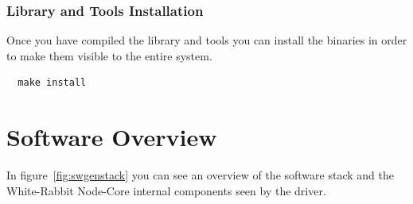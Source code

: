 \documentclass[a4paper,10pt]{article}
\begin{document}
\subsubsection{Library and Tools Installation}%
Once you have compiled the library and tools you can install the
binaries in order to make them visible to the entire system.

\begin{verbatim}
  make install
\end{verbatim}

\section{Software Overview}%
In figure~\ref{fig:swgenstack} you can see an overview of the software
stack and the White-Rabbit Node-Core internal components seen by the
driver.
\end{document}
